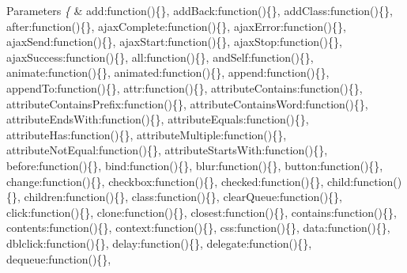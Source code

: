 \begin{DoxyParams}{Parameters}
{\em \{} & \textquotesingle{}add\textquotesingle{}\+:function()\{\}, \textquotesingle{}add\+Back\textquotesingle{}\+:function()\{\}, \textquotesingle{}add\+Class\textquotesingle{}\+:function()\{\}, \textquotesingle{}after\textquotesingle{}\+:function()\{\}, \textquotesingle{}ajax\+Complete\textquotesingle{}\+:function()\{\}, \textquotesingle{}ajax\+Error\textquotesingle{}\+:function()\{\}, \textquotesingle{}ajax\+Send\textquotesingle{}\+:function()\{\}, \textquotesingle{}ajax\+Start\textquotesingle{}\+:function()\{\}, \textquotesingle{}ajax\+Stop\textquotesingle{}\+:function()\{\}, \textquotesingle{}ajax\+Success\textquotesingle{}\+:function()\{\}, \textquotesingle{}all\textquotesingle{}\+:function()\{\}, \textquotesingle{}and\+Self\textquotesingle{}\+:function()\{\}, \textquotesingle{}animate\textquotesingle{}\+:function()\{\}, \textquotesingle{}animated\textquotesingle{}\+:function()\{\}, \textquotesingle{}append\textquotesingle{}\+:function()\{\}, \textquotesingle{}append\+To\textquotesingle{}\+:function()\{\}, \textquotesingle{}attr\textquotesingle{}\+:function()\{\}, \textquotesingle{}attribute\+Contains\textquotesingle{}\+:function()\{\}, \textquotesingle{}attribute\+Contains\+Prefix\textquotesingle{}\+:function()\{\}, \textquotesingle{}attribute\+Contains\+Word\textquotesingle{}\+:function()\{\}, \textquotesingle{}attribute\+Ends\+With\textquotesingle{}\+:function()\{\}, \textquotesingle{}attribute\+Equals\textquotesingle{}\+:function()\{\}, \textquotesingle{}attribute\+Has\textquotesingle{}\+:function()\{\}, \textquotesingle{}attribute\+Multiple\textquotesingle{}\+:function()\{\}, \textquotesingle{}attribute\+Not\+Equal\textquotesingle{}\+:function()\{\}, \textquotesingle{}attribute\+Starts\+With\textquotesingle{}\+:function()\{\}, \textquotesingle{}before\textquotesingle{}\+:function()\{\}, \textquotesingle{}bind\textquotesingle{}\+:function()\{\}, \textquotesingle{}blur\textquotesingle{}\+:function()\{\}, \textquotesingle{}button\textquotesingle{}\+:function()\{\}, \textquotesingle{}change\textquotesingle{}\+:function()\{\}, \textquotesingle{}checkbox\textquotesingle{}\+:function()\{\}, \textquotesingle{}checked\textquotesingle{}\+:function()\{\}, \textquotesingle{}child\textquotesingle{}\+:function()\{\}, \textquotesingle{}children\textquotesingle{}\+:function()\{\}, \textquotesingle{}class\textquotesingle{}\+:function()\{\}, \textquotesingle{}clear\+Queue\textquotesingle{}\+:function()\{\}, \textquotesingle{}click\textquotesingle{}\+:function()\{\}, \textquotesingle{}clone\textquotesingle{}\+:function()\{\}, \textquotesingle{}closest\textquotesingle{}\+:function()\{\}, \textquotesingle{}contains\textquotesingle{}\+:function()\{\}, \textquotesingle{}contents\textquotesingle{}\+:function()\{\}, \textquotesingle{}context\textquotesingle{}\+:function()\{\}, \textquotesingle{}css\textquotesingle{}\+:function()\{\}, \textquotesingle{}data\textquotesingle{}\+:function()\{\}, \textquotesingle{}dblclick\textquotesingle{}\+:function()\{\}, \textquotesingle{}delay\textquotesingle{}\+:function()\{\}, \textquotesingle{}delegate\textquotesingle{}\+:function()\{\}, \textquotesingle{}dequeue\textquotesingle{}\+:function()\{\}, 
\end{DoxyParams}
